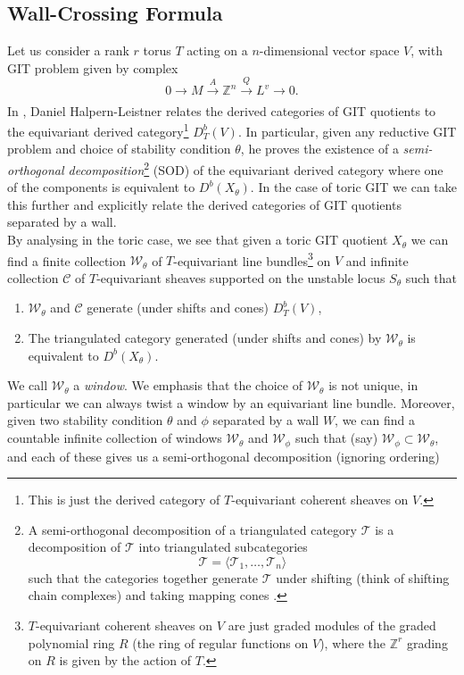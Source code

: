 \documentclass[oneside]{amsart}
\theoremstyle{definition}
\theoremstyle{definition}
\theoremstyle{definition}
\theoremstyle{definition}
\newcommand{\Z}{\mathbb{Z}}
\begin{document}
\subsection{Wall-Crossing Formula}
\label{wallcrossing}
Let us consider a rank $r$ torus $T$ acting on a $n$-dimensional vector space $V$, with GIT problem given by complex
$$
0 \xrightarrow[]{} M \xrightarrow[]{A} \Z^n \xrightarrow[]{Q} L^v \xrightarrow[]{} 0.
$$
In \cite{derivedgit}, Daniel Halpern-Leistner relates the derived categories of GIT quotients to the equivariant derived category\footnote{This is just the derived category of $T$-equivariant coherent sheaves on $V$. } $D^b_T(V)$. In particular, given any reductive GIT problem and choice of stability condition $\theta$, he proves the existence of a \textit{semi-orthogonal decomposition}\footnote{A semi-orthogonal decomposition of a triangulated category $\mathcal{T}$ is a decomposition of $\mathcal{T}$ into triangulated subcategories $$
\mathcal{T} = \langle \mathcal{T}_1, \dots, \mathcal{T}_n \rangle
$$
such that the categories together generate $\mathcal{T}$ under shifting (think of shifting chain complexes) and taking mapping cones \cite[Chapter 1]{huybrechts}. } (SOD) of the equivariant derived category where one of the components is equivalent to $D^b(X_{\theta})$. In the case of toric GIT we can take this further and explicitly relate the derived categories of GIT quotients separated by a wall. \\
\newline
By analysing \cite{derivedgit} in the toric case, we see that given a toric GIT quotient $X_{\theta}$ we can find a finite collection $\mathcal{W}_\theta$ of $T$-equivariant line bundles\footnote{$T$-equivariant coherent sheaves on $V$ are just graded modules of the graded polynomial ring $R$ (the ring of regular functions on $V$), where the $\Z^r$ grading on $R$ is given by the action of $T$.} on $V$ and infinite collection $\mathcal{C}$ of $T$-equivariant sheaves supported on the unstable locus $S_{\theta}$ such that
\begin{enumerate}
    \item $\mathcal{W}_\theta$ and $\mathcal{C}$ generate (under shifts and cones) $D^b_T(V)$,
    \item The triangulated category generated (under shifts and cones) by $\mathcal{W}_{\theta}$ is equivalent to $D^b(X_\theta)$.
\end{enumerate}
We call $\mathcal{W}_\theta$ a \textit{window}. We emphasis that the choice of $\mathcal{W}_{\theta}$ is not unique, in particular we can always twist a window by an equivariant line bundle. Moreover, given two stability condition $\theta$ and $\phi$ separated by a wall $W$, we can find a countable infinite collection of windows $\mathcal{W}_{\theta}$ and $\mathcal{W}_{\phi}$ such that (say) $\mathcal{W}_{\phi} \subset \mathcal{W}_{\theta} $, and each of these gives us a semi-orthogonal decomposition (ignoring ordering)
\end{document}
